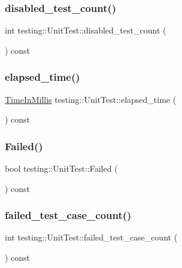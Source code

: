 \subsubsection{\texorpdfstring{disabled\_test\_count()}{disabled\_test\_count()}}
{\footnotesize\ttfamily int testing\+::\+Unit\+Test\+::disabled\+\_\+test\+\_\+count (\begin{DoxyParamCaption}{ }\end{DoxyParamCaption}) const}

\mbox{\label{classtesting_1_1_unit_test_a410e14e52f505dabe2054e5018e9ca33}} 
\subsubsection{\texorpdfstring{elapsed\_time()}{elapsed\_time()}}
{\footnotesize\ttfamily \mbox{\hyperlink{namespacetesting_a992de1d091ce660f451d1e8b3ce30fd6}{Time\+In\+Millis}} testing\+::\+Unit\+Test\+::elapsed\+\_\+time (\begin{DoxyParamCaption}{ }\end{DoxyParamCaption}) const}

\mbox{\label{classtesting_1_1_unit_test_a706f29e765916616b11a271a65948727}} 
\subsubsection{\texorpdfstring{Failed()}{Failed()}}
{\footnotesize\ttfamily bool testing\+::\+Unit\+Test\+::\+Failed (\begin{DoxyParamCaption}{ }\end{DoxyParamCaption}) const}

\mbox{\label{classtesting_1_1_unit_test_abc0fa297a4103f7cdd9627ae27d9d0ef}} 
\subsubsection{\texorpdfstring{failed\_test\_case\_count()}{failed\_test\_case\_count()}}
{\footnotesize\ttfamily int testing\+::\+Unit\+Test\+::failed\+\_\+test\+\_\+case\+\_\+count (\begin{DoxyParamCaption}{ }\end{DoxyParamCaption}) const}

